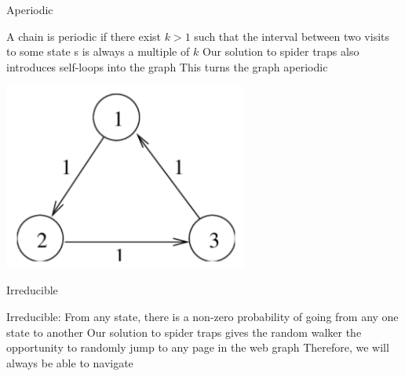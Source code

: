 \documentclass{beamer}
\begin{document}
\begin{frame}[t]{Aperiodic}
\begin{outline}
    \1 A chain is periodic if there exist $k > 1$ such that the interval between two visits to some state s is always a multiple of $k$
    \1 Our solution to spider traps also introduces self-loops into the graph 
    \1 This turns the graph aperiodic
    
    \begin{center}
        \includegraphics[width=0.6\textwidth]{aperiodic.png}
    \end{center}

\end{outline}

\end{frame}

\begin{frame}[t]{Irreducible}
\begin{outline}
    \1 Irreducible: From any state, there is a non-zero probability of going from any one state to another
    \1 Our solution to spider traps gives the random walker the opportunity to randomly jump to any page in the web graph
    \1 Therefore, we will always be able to navigate 
\end{outline}
\end{frame}
\end{document}
